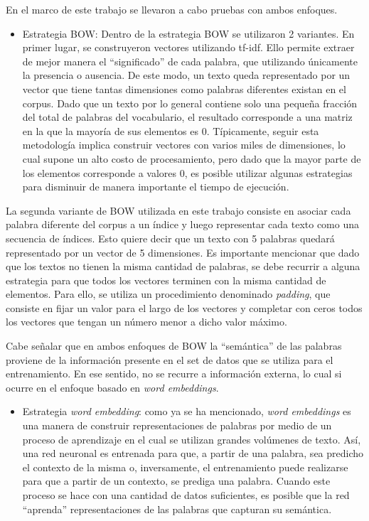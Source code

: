 \documentclass[
  12pt,
  spanish,
]{article}
\providecommand{\tightlist}{%
  \setlength{\itemsep}{0pt}\setlength{\parskip}{0pt}}
\begin{document}
En el marco de este trabajo se llevaron a cabo pruebas con ambos
enfoques.

\begin{itemize}
\tightlist
\item
  Estrategia BOW: Dentro de la estrategia BOW se utilizaron 2 variantes.
  En primer lugar, se construyeron vectores utilizando tf-idf. Ello
  permite extraer de mejor manera el ``significado'' de cada palabra,
  que utilizando únicamente la presencia o ausencia. De este modo, un
  texto queda representado por un vector que tiene tantas dimensiones
  como palabras diferentes existan en el corpus. Dado que un texto por
  lo general contiene solo una pequeña fracción del total de palabras
  del vocabulario, el resultado corresponde a una matriz en la que la
  mayoría de sus elementos es 0. Típicamente, seguir esta metodología
  implica construir vectores con varios miles de dimensiones, lo cual
  supone un alto costo de procesamiento, pero dado que la mayor parte de
  los elementos corresponde a valores 0, es posible utilizar algunas
  estrategias para disminuir de manera importante el tiempo de
  ejecución.
\end{itemize}

La segunda variante de BOW utilizada en este trabajo consiste en asociar
cada palabra diferente del corpus a un índice y luego representar cada
texto como una secuencia de índices. Esto quiere decir que un texto con
5 palabras quedará representado por un vector de 5 dimensiones. Es
importante mencionar que dado que los textos no tienen la misma cantidad
de palabras, se debe recurrir a alguna estrategia para que todos los
vectores terminen con la misma cantidad de elementos. Para ello, se
utiliza un procedimiento denominado \emph{padding}, que consiste en
fijar un valor para el largo de los vectores y completar con ceros todos
los vectores que tengan un número menor a dicho valor máximo.

Cabe señalar que en ambos enfoques de BOW la ``semántica'' de las
palabras proviene de la información presente en el set de datos que se
utiliza para el entrenamiento. En ese sentido, no se recurre a
información externa, lo cual si ocurre en el enfoque basado en
\emph{word embeddings}.

\begin{itemize}
\tightlist
\item
  Estrategia \emph{word embedding}: como ya se ha mencionado, \emph{word
  embeddings} es una manera de construir representaciones de palabras
  por medio de un proceso de aprendizaje en el cual se utilizan grandes
  volúmenes de texto. Así, una red neuronal es entrenada para que, a
  partir de una palabra, sea predicho el contexto de la misma o,
  inversamente, el entrenamiento puede realizarse para que a partir de
  un contexto, se prediga una palabra. Cuando este proceso se hace con
  una cantidad de datos suficientes, es posible que la red ``aprenda''
  representaciones de las palabras que capturan su semántica.
\end{itemize}
\end{document}
